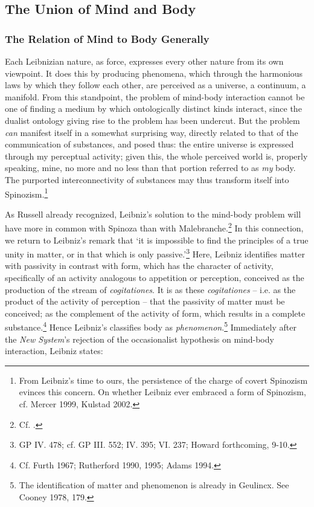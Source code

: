 \documentclass{article}
\begin{document}
\subsection{The Union of Mind and
Body}

\subsubsection{The Relation of Mind to Body
Generally}
Each Leibnizian nature, as force, expresses every other nature from its
own viewpoint. It does this by producing phenomena, which through the
harmonious laws by which they follow each other, are perceived as a
universe, a continuum, a manifold. From this standpoint, the problem of
mind-body interaction cannot be one of finding a medium by which
ontologically distinct kinds interact, since the dualist ontology giving
rise to the problem has been undercut. But the problem \emph{can}
manifest itself in a somewhat surprising way, directly related to that
of the communication of substances, and posed thus: the entire universe
is expressed through my perceptual activity; given this, the whole
perceived world is, properly speaking, mine, no more and no less than
that portion referred to as \emph{my} body. The purported
interconnectivity of substances may thus transform itself into
Spinozism.\footnote{From Leibniz's time to ours, the persistence of the
  charge of covert Spinozism evinces this concern. On whether Leibniz
  ever embraced a form of Spinozism, cf. Mercer 1999, Kulstad 2002.}

As Russell already recognized, Leibniz's solution to the mind-body
problem will have more in common with Spinoza than with
Malebranche.\footnote{Cf. \autocite[139]{Russell1951}.} In this connection, we
return to Leibniz's remark that `it is impossible to find the principles
of a true unity in matter, or in that which is only passive.'\footnote{GP
  IV. 478; cf. GP III. 552; IV. 395; VI. 237; Howard forthcoming, 9-10.}
Here, Leibniz identifies matter with passivity in contrast with form,
which has the character of activity, specifically of an activity
analogous to appetition or perception, conceived as the production of
the stream of \emph{cogitationes}. It is as these \emph{cogitationes} --
i.e. as the product of the activity of perception -- that the passivity
of matter must be conceived; as the complement of the activity of form,
which results in a complete substance.\footnote{Cf. Furth 1967;
  Rutherford 1990, 1995; Adams 1994.} Hence Leibniz's classifies body as
\emph{phenomenon}.\footnote{The identification of matter and phenomenon
  is already in Geulincx. See Cooney 1978, 179.} Immediately after the
\emph{New System}'s rejection of the occasionalist hypothesis on
mind-body interaction, Leibniz states:
\end{document}
